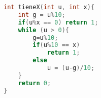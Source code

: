 \begin{lstlisting}[language=C++]
int tieneX(int u, int x){
	int g = u%10;
	if(u%x == 0) return 1;
	while (u > 0){
		g=u%10;
		if(u%10 == x)
			return 1;
		else
			u = (u-g)/10;
	}
	return 0;
}
\end{lstlisting}